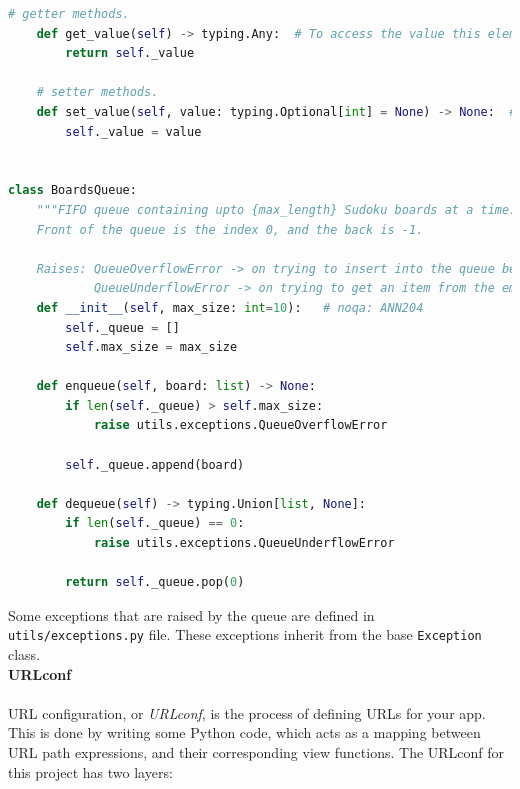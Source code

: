 \documentclass[12pt, a4paper]{report}
\newcommand{\code}[1]{\colorbox{light-gray}{\texttt{#1}}}
\begin{document}
\begin{lstlisting}[language=Python, caption=utils/classes.py]
    # getter methods.
    def get_value(self) -> typing.Any:  # To access the value this element has.
        return self._value

    # setter methods.
    def set_value(self, value: typing.Optional[int] = None) -> None:  # To access the value this element will have.
        self._value = value


class BoardsQueue:
    """FIFO queue containing upto {max_length} Sudoku boards at a time.
    Front of the queue is the index 0, and the back is -1.
    
    Raises: QueueOverflowError -> on trying to insert into the queue beyond it's specified max_size
            QueueUnderflowError -> on trying to get an item from the empty queue."""
    def __init__(self, max_size: int=10):   # noqa: ANN204
        self._queue = []
        self.max_size = max_size

    def enqueue(self, board: list) -> None:
        if len(self._queue) > self.max_size:
            raise utils.exceptions.QueueOverflowError
        
        self._queue.append(board)

    def dequeue(self) -> typing.Union[list, None]:
        if len(self._queue) == 0:
            raise utils.exceptions.QueueUnderflowError
        
        return self._queue.pop(0)
    \end{lstlisting}
    Some exceptions that are raised by the queue are defined in \texttt{utils/exceptions.py} file. These exceptions inherit from the base \code{Exception} class.\\
    \newline
    \textbf{URLconf}\\\\
    URL configuration, or \textit{URLconf}, is the process of defining URLs for your app. This is done by writing some Python code, which acts as a mapping between URL path expressions, and their corresponding view functions.
    The URLconf for this project has two layers:
\end{document}

